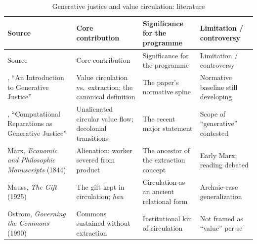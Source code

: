 \goldrule
\footnotesize
\begin{longtable}{Y Y Y Y}
\caption{Generative justice and value circulation: literature}\label{p07:tab:lit-genjust}\\
\toprule
{}
Source & Core contribution & Significance for the programme & Limitation / controversy \\
\midrule
\endfirsthead
{}
Source & Core contribution & Significance for the programme & Limitation / controversy \\
\midrule
\endhead
\textcite{eglash2016intro}, ``An Introduction to Generative Justice'' & Value circulation vs.\ extraction; the canonical definition & The paper's normative spine & Normative baseline still developing \\
\textcite{eglash2024computational}, ``Computational Reparations as Generative Justice'' & Unalienated circular value flow; decolonial transitions & The recent major statement & Scope of ``generative'' contested \\
Marx, \emph{Economic and Philosophic Manuscripts} (1844) & Alienation: worker severed from product & The ancestor of the extraction concept & Early Marx; reading debated \\
Mauss, \emph{The Gift} (1925) & The gift kept in circulation; \emph{hau} & Circulation as an ancient relational form & Archaic-case generalization \\
Ostrom, \emph{Governing the Commons} (1990) & Commons sustained without extraction & Institutional kin of circulation & Not framed as ``value'' per se \\
\bottomrule
\end{longtable}

